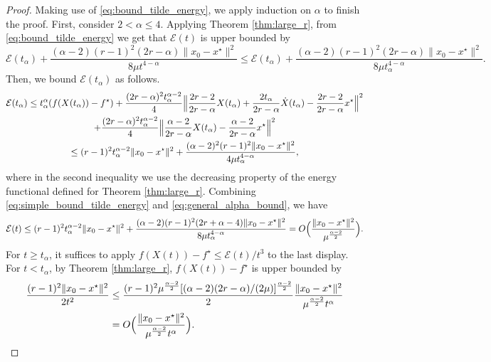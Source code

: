\documentclass[twoside,11pt]{article}
\begin{document}
\begin{proof}
Making use of \eqref{eq:bound_tilde_energy}, we apply induction on
$\alpha$ to finish the proof. First, consider $2 < \alpha \le
4$. Applying Theorem \ref{thm:large_r}, from
\eqref{eq:bound_tilde_energy} we get that $\mathcal{E}(t)$ is upper
bounded by
\begin{equation}\label{eq:simple_bound_tilde_energy}
\mathcal{E}(t_{\alpha}) + 
\frac{(\alpha-2)(r-1)^2(2r-\alpha)\|x_0-x^\star\|^2}{8\mu t^{4-\alpha}} \le \mathcal{E}(t_{\alpha}) + 
\frac{(\alpha-2)(r-1)^2(2r-\alpha)\|x_0-x^\star\|^2}{8\mu t_{\alpha}^{4-\alpha}}.
\end{equation}
Then, we bound $\mathcal{E}(t_{\alpha})$ as follows.
\begin{multline}\label{eq:general_alpha_bound}
\mathcal{E}(t_{\alpha}) \le t_{\alpha}^{\alpha}(f(X(t_{\alpha})) - f^\star) + \frac{(2r-\alpha)^2t_{\alpha}^{\alpha-2}}{4}\Big{\|}\frac{2r-2}{2r-\alpha}X(t_{\alpha})+ \frac{2t_{\alpha}}{2r-\alpha}\dot X(t_{\alpha}) - \frac{2r-2}{2r-\alpha}x^\star\Big{\|}^2\\
 + \frac{(2r-\alpha)^2t_{\alpha}^{\alpha-2}}{4}\Big{\|}\frac{\alpha-2}{2r-\alpha}X(t_{\alpha})  - \frac{\alpha-2}{2r-\alpha}x^\star\Big{\|}^2 \\
\le (r-1)^2t_{\alpha}^{\alpha-2}\|x_0-x^\star\|^2 + \frac{(\alpha-2)^2(r-1)^2\|x_0-x^\star\|^2}{4\mu t_{\alpha}^{4-\alpha}},
\end{multline}
where in the second inequality we use the decreasing property of the energy functional defined for Theorem \ref{thm:large_r}. Combining \eqref{eq:simple_bound_tilde_energy} and \eqref{eq:general_alpha_bound}, we have
\begin{equation}\nonumber
\mathcal{E}(t) \le (r-1)^2t_{\alpha}^{\alpha-2}\|x_0-x^\star\|^2 + \frac{(\alpha-2)(r-1)^2(2r+\alpha-4)\|x_0-x^\star\|^2}{8\mu t_{\alpha}^{4-\alpha}} = O \Big{(} \frac{\|x_0-x^\star\|^2}{\mu^{\frac{\alpha-2}{2}}}  \Big{)}.
\end{equation}
For $t \ge t_{\alpha}$, it suffices to apply $f(X(t))-f^\star\le \mathcal{E}(t)/t^3$ to the last display. For $t < t_{\alpha}$, by Theorem \ref{thm:large_r}, $f(X(t)) - f^\star$ is upper bounded by
\begin{equation}\label{eq:alpha_general_alpha_small_t}
\begin{aligned}
\frac{(r-1)^2\|x_0 - x^\star\|^2}{2t^2} &\le \frac{(r-1)^2\mu^{\frac{\alpha-2}{2}}[(\alpha-2)(2r-\alpha)/(2\mu)]^{\frac{\alpha-2}{2}}}{2}\frac{\|x_0-x^\star\|^2}{\mu^{\frac{\alpha-2}{2}}t^{\alpha}} \\
&= O\Big{(}\frac{\|x_0-x^\star\|^2}{\mu^{\frac{\alpha-2}{2}}t^{\alpha}} \Big{)}.
\end{aligned}
\end{equation}


\end{proof}
\end{document}
